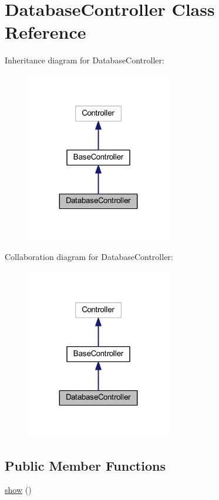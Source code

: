 \hypertarget{class_database_controller}{}\section{Database\+Controller Class Reference}
\label{class_database_controller}


Inheritance diagram for Database\+Controller\+:
\nopagebreak
\begin{figure}[H]
\begin{center}
\leavevmode
\includegraphics[width=179pt]{class_database_controller__inherit__graph}
\end{center}
\end{figure}


Collaboration diagram for Database\+Controller\+:
\nopagebreak
\begin{figure}[H]
\begin{center}
\leavevmode
\includegraphics[width=179pt]{class_database_controller__coll__graph}
\end{center}
\end{figure}
\subsection*{Public Member Functions}
\begin{DoxyCompactItemize}
\item 
\hyperlink{class_database_controller_a2b8e3779f5bd8c38f70307574859bd36}{show} ()
\end{DoxyCompactItemize}
